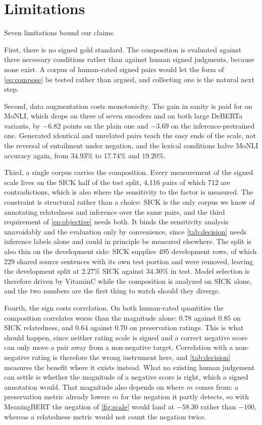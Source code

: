 \documentclass[11pt]{article}
\begin{document}
\section*{Limitations}

Seven limitations bound our claims.

First, there is no signed gold standard.
The composition is evaluated against three necessary conditions rather than against human signed judgments, because none exist.
A corpus of human-rated signed pairs would let the form of \autoref{eq:compose} be tested rather than argued, and collecting one is the natural next step.

Second, data augmentation costs monotonicity.
The gain in sanity is paid for on MoNLI, which drops on three of seven encoders and on both large DeBERTa variants, by $-6.82$ points on the plain one and $-3.69$ on the inference-pretrained one.
Generated identical and unrelated pairs teach the easy ends of the scale, not the reversal of entailment under negation, and the lexical conditions halve MoNLI accuracy again, from $34.93\%$ to $17.74\%$ and $19.20\%$.

Third, a single corpus carries the composition.
Every measurement of the signed scale lives on the SICK half of the test split, 4{,}116 pairs of which 712 are contradictions, which is also where the sensitivity to the factor is measured.
The constraint is structural rather than a choice: SICK is the only corpus we know of annotating relatedness and inference over the same pairs, and the third requirement of \autoref{eq:objective} needs both.
It binds the sensitivity analysis unavoidably and the evaluation only by convenience, since \autoref{tab:decision} needs inference labels alone and could in principle be measured elsewhere.
The split is also thin on the development side: SICK supplies 495 development rows, of which 229 shared source sentences with its own test portion and were removed, leaving the development split at $2.27\%$ SICK against $34.30\%$ in test.
Model selection is therefore driven by VitaminC while the composition is analyzed on SICK alone, and the two numbers are the first thing to watch should they diverge.

Fourth, the sign costs correlation.
On both human-rated quantities the composition correlates worse than the magnitude alone: $0.78$ against $0.85$ on SICK relatedness, and $0.64$ against $0.70$ on preservation ratings.
This is what should happen, since neither rating scale is signed and a correct negative score can only move a pair away from a non-negative target.
Correlation with a non-negative rating is therefore the wrong instrument here, and \autoref{tab:decision} measures the benefit where it exists instead.
What no existing human judgement can settle is whether the magnitude of a negative score is right, which a signed annotation would.
That magnitude also depends on where $m$ comes from: a preservation metric already lowers $m$ for the negation it partly detects, so with MeaningBERT the negation of \autoref{fig:scale} would land at $-58.30$ rather than $-100$, whereas a relatedness metric would not count the negation twice.
\end{document}
